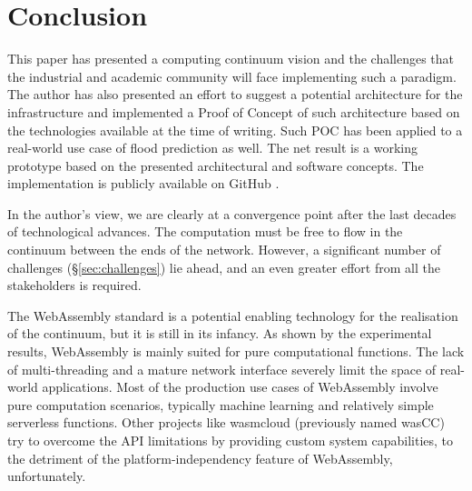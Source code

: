 \section{Conclusion}
\label{sec:conclusion}

This paper has presented a computing continuum vision and the challenges that the industrial and academic community will face implementing such a paradigm. The author has also presented an effort to suggest a potential architecture for the infrastructure and implemented a Proof of Concept of such architecture based on the technologies available at the time of writing. Such POC has been applied to a real-world use case of flood prediction as well. The net result is a working prototype based on the presented architectural and software concepts. The implementation is publicly available on GitHub \cite{fedra-thesis}. 

In the author's view, we are clearly at a convergence point after the last decades of technological advances. The computation must be free to flow in the continuum between the ends of the network. However, a significant number of challenges (§\ref{sec:challenges}) lie ahead, and an even greater effort from all the stakeholders is required.

The WebAssembly standard is a potential enabling technology for the realisation of the continuum, but it is still in its infancy. As shown by the experimental results, WebAssembly is mainly suited for pure computational functions. The lack of multi-threading and a mature network interface severely limit the space of real-world applications. Most of the production use cases of WebAssembly involve pure computation scenarios, typically machine learning and relatively simple serverless functions. Other projects like wasmcloud \cite{wasmcloud} (previously named wasCC) try to overcome the API limitations by providing custom system capabilities, to the detriment of the platform-independency feature of WebAssembly, unfortunately.


